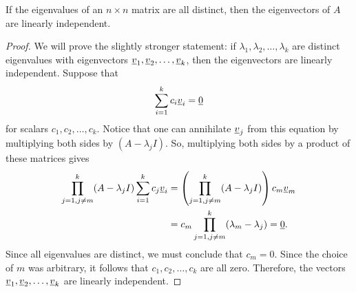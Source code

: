 \begin{theorem}
If the eigenvalues of an $n \times n$ matrix are all distinct, then the eigenvectors of $A$ are linearly independent.
\end{theorem}
\begin{proof}
We will prove the slightly stronger statement: if $\lambda_1 , \lambda_2 , \ldots, \lambda_k $ are distinct eigenvalues with eigenvectors $\underline{v}_1 , \underline{v}_2 , \ldots, \underline{v}_k$, then the eigenvectors are linearly independent.
Suppose that
\begin{equation*}
\sum_{i=1}^k c_i \underline{v}_i = \underline{0}
\end{equation*}
for scalars $c_1, c_2, \ldots, c_k$.
Notice that one can annihilate $\underline{v}_j$ from this equation by multiplying both sides by $(A-\lambda_j I)$.
So, multiplying both sides by a product of these matrices gives
\begin{align*}
\prod_{j=1,j\neq m}^k (A-\lambda_j I) \sum_{i=1}^k c_j \underline{v}_i
&= \left( \prod_{j=1,j\neq m}^k (A-\lambda_j I) \right) c_m \underline{v}_m \\
&= c_m \prod_{j=1,j\neq m}^k (\lambda_m - \lambda_j) = \underline{0}.
\end{align*}
Since all eigenvalues are distinct, we must conclude that $c_m = 0$.
Since the choice of $m$ was arbitrary, it follows that $c_1,c_2,\ldots,c_k$ are all zero.
Therefore, the vectors $\underline{v}_1 , \underline{v}_2 , \ldots, \underline{v}_k$ are linearly independent.
\end{proof}

